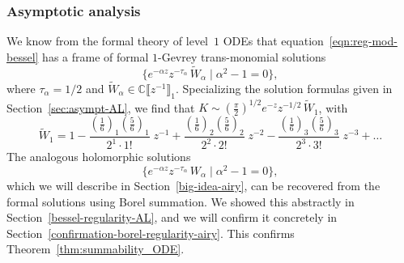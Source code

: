 \documentclass{article}
\newcommand{\C}{\mathbb{C}}
\newcommand{\series}[1]{\tilde{#1}}
\theoremstyle{definition}
\theoremstyle{plain}
\begin{document}
\subsubsection{Asymptotic analysis}\label{sec:asympt-airy}
%
We know from the formal theory of level~$1$ ODEs that equation~\eqref{eqn:reg-mod-bessel} has a frame of formal $1$-Gevrey trans-monomial solutions
\[ \{ e^{-\alpha z} z^{-\tau_\alpha}\,\series{W}_\alpha \mid \alpha^2 - 1 = 0 \}, \]
where $\tau_\alpha = 1/2$ and $\series{W}_\alpha\in\C\llbracket z^{-1} \rrbracket_1$. Specializing the solution formulas given in Section~\ref{sec:asympt-AL}, we find that $K \sim \left(\tfrac{\pi}{2}\right)^{1/2} e^{-z} z^{-1/2}\,\series{W}_1$, with
\begin{equation}\label{bessel-asymp}
\series{W}_1 = 1 - \frac{(\tfrac{1}{6})_1 (\tfrac{5}{6})_1}{2^1 \cdot 1!}\;z^{-1} + \frac{(\tfrac{1}{6})_2 (\tfrac{5}{6})_2}{2^2 \cdot 2!}\;z^{-2} - \frac{(\tfrac{1}{6})_3 (\tfrac{5}{6})_3}{2^3 \cdot 3!}\;z^{-3} + \ldots
\end{equation}
%
The analogous holomorphic solutions
\[ \{ e^{-\alpha z} z^{-\tau_\alpha}\,W_\alpha \mid \alpha^2 - 1 = 0 \}, \]
which we will describe in Section~\ref{big-idea-airy}, can be recovered from the formal solutions using Borel summation. We showed this abstractly in Section~\ref{bessel-regularity-AL}, and we will confirm it concretely in Section~\ref{confirmation-borel-regularity-airy}. This confirms Theorem~\ref{thm:summability_ODE}.
%
\end{document}
